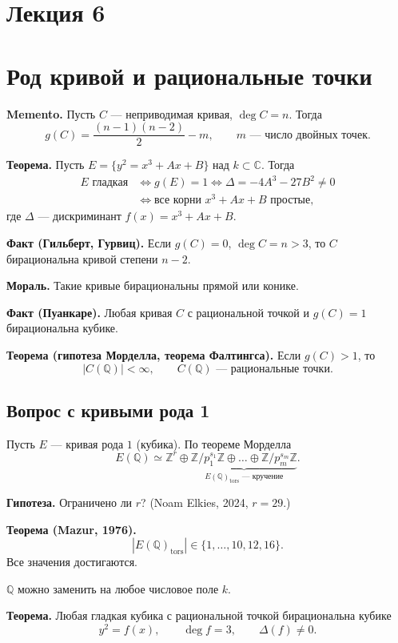 \documentclass[12pt,a4paper]{article}
\newcommand{\Z}{\mathbb Z}
\newcommand{\Q}{\mathbb Q}
\newcommand{\CC}{\mathbb C}
\newcommand{\tors}{\mathrm{tors}}
\begin{document}
\section*{\centering Лекция 6}

\section{Род кривой и рациональные точки}

\textbf{Memento.} Пусть $C$ --- неприводимая кривая, $\deg C=n$. Тогда
\[
g(C)=\frac{(n-1)(n-2)}2-m,
\qquad m\text{ --- число двойных точек}.
\]

\textbf{Теорема.} Пусть $E=\{y^2=x^3+Ax+B\}$ над $k\subset\CC$. Тогда
\begin{align*}
E\text{ гладкая}
&\Longleftrightarrow g(E)=1
\Longleftrightarrow \Delta=-4A^3-27B^2\ne0\\
&\Longleftrightarrow \text{все корни }x^3+Ax+B\text{ простые},
\end{align*}
где $\Delta$ --- дискриминант $f(x)=x^3+Ax+B$.

\textbf{Факт (Гильберт, Гурвиц).} Если $g(C)=0$, $\deg C=n>3$, то
$C$ бирациональна кривой степени $n-2$.

\textbf{Мораль.} Такие кривые бирациональны прямой или конике.

\textbf{Факт (Пуанкаре).} Любая кривая $C$ с рациональной точкой и
$g(C)=1$ бирациональна кубике.

\textbf{Теорема (гипотеза Морделла, теорема Фалтингса).}
Если $g(C)>1$, то
\[
|C(\Q)|<\infty,
\qquad C(\Q)\text{ --- рациональные точки}.
\]

\subsection*{Вопрос с кривыми рода 1}
Пусть $E$ --- кривая рода $1$ (кубика). По теореме Морделла
\[
E(\Q)\simeq\Z^r\oplus
\underbrace{\Z/p_1^{s_1}\Z\oplus\dots\oplus\Z/p_m^{s_m}\Z}
_{E(\Q)_{\tors}\text{ --- кручение}}.
\]

\textbf{Гипотеза.} Ограничено ли $r$? (Noam Elkies, 2024, $r=29$.)

\textbf{Теорема (Mazur, 1976).}
\[
|E(\Q)_{\tors}|\in\{1,\dots,10,12,16\}.
\]
Все значения достигаются.

$\Q$ можно заменить на любое числовое поле $k$.

\textbf{Теорема.} Любая гладкая кубика с рациональной точкой бирациональна
кубике
\[
y^2=f(x),\qquad \deg f=3,\qquad\Delta(f)\ne0.
\]
\end{document}
